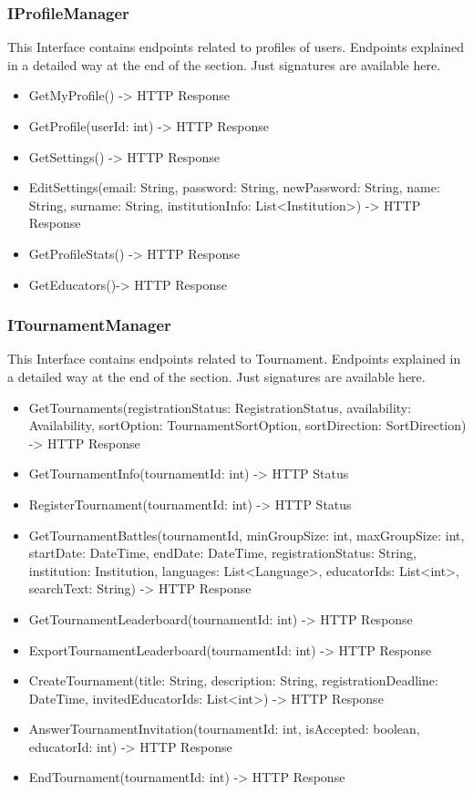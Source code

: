 \subsubsection{IProfileManager}
This Interface contains endpoints related to profiles of users. Endpoints explained in a detailed way at the end of the section. Just signatures are available here.
\begin{itemize}
\item GetMyProfile() -> HTTP Response
\item GetProfile(userId: int) -> HTTP Response
\item GetSettings() -> HTTP Response
\item EditSettings(email: String, password: String, newPassword: String, name: String, surname: String, institutionInfo: List<Institution>) -> HTTP Response
\item GetProfileStats() -> HTTP Response
\item GetEducators()-> HTTP Response
\end{itemize}
\subsubsection{ITournamentManager}
This Interface contains endpoints related to Tournament. Endpoints explained in a detailed way at the end of the section. Just signatures are available here.
\begin{itemize}
\item GetTournaments(registrationStatus: RegistrationStatus, availability: Availability, sortOption: TournamentSortOption, sortDirection: SortDirection) -> HTTP Response
\item GetTournamentInfo(tournamentId: int) -> HTTP Status
\item RegisterTournament(tournamentId: int) -> HTTP Status
\item GetTournamentBattles(tournamentId, minGroupSize: int, maxGroupSize: int, startDate: DateTime, endDate: DateTime, registrationStatus: String, institution: Institution, languages: List<Language>, educatorIds: List<int>, searchText: String) -> HTTP Response
\item GetTournamentLeaderboard(tournamentId: int) -> HTTP Response
\item ExportTournamentLeaderboard(tournamentId: int) -> HTTP Response
\item CreateTournament(title: String, description: String, registrationDeadline: DateTime, invitedEducatorIds: List<int>) -> HTTP Response
\item AnswerTournamentInvitation(tournamentId: int, isAccepted: boolean, educatorId: int) -> HTTP Response
\item EndTournament(tournamentId: int) -> HTTP Response
\end{itemize}

